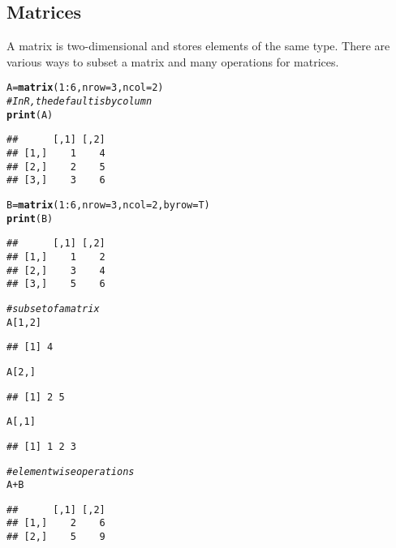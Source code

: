 \documentclass[12pt]{article}\usepackage[]{graphicx}\usepackage[]{color}
\makeatletter
\newcommand{\hlnum}[1]{\textcolor[rgb]{0.686,0.059,0.569}{#1}}%
\newcommand{\hlcom}[1]{\textcolor[rgb]{0.678,0.584,0.686}{\textit{#1}}}%
\newcommand{\hlopt}[1]{\textcolor[rgb]{0,0,0}{#1}}%
\newcommand{\hlstd}[1]{\textcolor[rgb]{0.345,0.345,0.345}{#1}}%
\newcommand{\hlkwb}[1]{\textcolor[rgb]{0.69,0.353,0.396}{#1}}%
\newcommand{\hlkwc}[1]{\textcolor[rgb]{0.333,0.667,0.333}{#1}}%
\newcommand{\hlkwd}[1]{\textcolor[rgb]{0.737,0.353,0.396}{\textbf{#1}}}%
\newenvironment{kframe}{%
 \def\at@end@of@kframe{}%
 \ifinner\ifhmode%
  \def\at@end@of@kframe{\end{minipage}}%
  \begin{minipage}{\columnwidth}%
 \fi\fi%
 \def\FrameCommand##1{\hskip\@totalleftmargin \hskip-\fboxsep
 \colorbox{shadecolor}{##1}\hskip-\fboxsep
     \hskip-\linewidth \hskip-\@totalleftmargin \hskip\columnwidth}%
 \MakeFramed {\advance\hsize-\width
   \@totalleftmargin\z@ \linewidth\hsize
   \@setminipage}}%
 {\par\unskip\endMakeFramed%
 \at@end@of@kframe}
\newenvironment{knitrout}{}{} %
\makeatother
\begin{document}
\subsection{Matrices}
A matrix is two-dimensional and stores elements of the same type. There are various ways to subset a matrix and many operations for matrices.
\begin{knitrout}
\color{fgcolor}\begin{kframe}
\begin{alltt}
\hlstd{A} \hlkwb{=} \hlkwd{matrix}\hlstd{(}\hlnum{1}\hlopt{:}\hlnum{6}\hlstd{,}\hlkwc{nrow}\hlstd{=}\hlnum{3}\hlstd{,}\hlkwc{ncol}\hlstd{=}\hlnum{2}\hlstd{)}
\hlcom{# In R, the default is by column}
\hlkwd{print}\hlstd{(A)}
\end{alltt}
\begin{verbatim}
##      [,1] [,2]
## [1,]    1    4
## [2,]    2    5
## [3,]    3    6
\end{verbatim}
\begin{alltt}
\hlstd{B} \hlkwb{=} \hlkwd{matrix}\hlstd{(}\hlnum{1}\hlopt{:}\hlnum{6}\hlstd{,}\hlkwc{nrow}\hlstd{=}\hlnum{3}\hlstd{,}\hlkwc{ncol}\hlstd{=}\hlnum{2}\hlstd{,}\hlkwc{byrow}\hlstd{=T)}
\hlkwd{print}\hlstd{(B)}
\end{alltt}
\begin{verbatim}
##      [,1] [,2]
## [1,]    1    2
## [2,]    3    4
## [3,]    5    6
\end{verbatim}
\begin{alltt}
\hlcom{# subset of a matrix}
\hlstd{A[}\hlnum{1}\hlstd{,}\hlnum{2}\hlstd{]}
\end{alltt}
\begin{verbatim}
## [1] 4
\end{verbatim}
\begin{alltt}
\hlstd{A[}\hlnum{2}\hlstd{,]}
\end{alltt}
\begin{verbatim}
## [1] 2 5
\end{verbatim}
\begin{alltt}
\hlstd{A[,}\hlnum{1}\hlstd{]}
\end{alltt}
\begin{verbatim}
## [1] 1 2 3
\end{verbatim}
\begin{alltt}
\hlcom{# elementwise operations}
\hlstd{A}\hlopt{+}\hlstd{B}
\end{alltt}
\begin{verbatim}
##      [,1] [,2]
## [1,]    2    6
## [2,]    5    9

\end{verbatim}
\end{kframe}
\end{knitrout}
\end{document}
